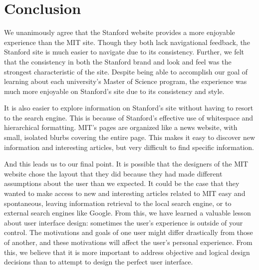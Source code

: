 \section*{Conclusion}

We unanimously agree that the Stanford website provides a more enjoyable experience
than the MIT site. Though they both lack navigational feedback, the
Stanford site is much easier to navigate due to its consistency. Further, we felt that the consistency in both the Stanford brand
and look and feel was the strongest characteristic of the site. Despite being able
to accomplish our goal of learning about each university's
Master of Science program, the experience was much more enjoyable on Stanford's
site due to its consistency and style.

It is also easier to explore information on Stanford's site without having to
resort to the search engine. This is because of Stanford's effective use of
whitespace and hierarchical formatting. MIT's pages are organized like a
news website, with small, isolated blurbs covering the entire page. This makes
it easy to discover new information and interesting articles, but very
difficult to find specific information.

And this leads us to our final point. It is possible that the designers of the
MIT website chose the layout that they did because they had made different
assumptions about the user than we expected. It could be the case that they
wanted to make access to new and interesting articles related to MIT easy
and spontaneous, leaving information retrieval to the local search engine, or
to external search engines like Google. From this, we have learned a valuable lesson
about user interface design: sometimes the user's experience is outside of
your control. The motivations and goals of one user might differ drastically
from those of another, and these motivations will affect the user's personal
experience. From this, we believe that it is more important to address objective and
logical design decisions than to attempt to design the perfect user interface.